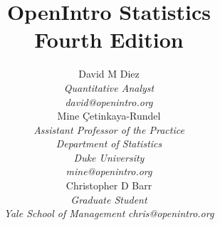 
\title{\huge OpenIntro Statistics\vspace{1.5mm} \\ \Large Fourth Edition}
\author{David M Diez \\
\small\emph{Quantitative Analyst} \\
\vspace{6mm}%
\small\emph{david@openintro.org} \\
Mine \c{C}etinkaya-Rundel \\
\small\emph{Assistant Professor of the Practice} \\
\small\emph{Department of Statistics} \\
\small\emph{Duke University} \\
\vspace{6mm}%
\small\emph{mine@openintro.org} \\
Christopher D Barr \\
\small\emph{Graduate Student} \\
\small\emph{Yale School of Management}
\small\emph{chris@openintro.org}}
